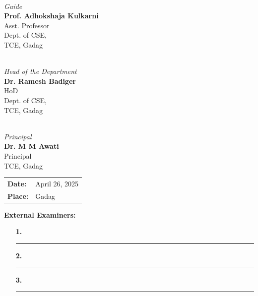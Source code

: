 \begin{minipage}[t]{0.3\textwidth}
    \centering
    \vspace{1.2cm}
    \hrulefill \\
    \emph{Guide}\\[0.15cm]
    \textbf{Prof. Adhokshaja Kulkarni}\\
    Asst. Professor\\
    Dept. of CSE,\\
    TCE, Gadag
\end{minipage}
\hfill
\begin{minipage}[t]{0.3\textwidth}
    \centering
    \vspace{1.2cm}
    \hrulefill \\
    \emph{Head of the Department}\\[0.15cm]
    \textbf{Dr. Ramesh Badiger}\\
    HoD\\
    Dept. of CSE,\\
    TCE, Gadag
\end{minipage}
\hfill
\begin{minipage}[t]{0.3\textwidth}
    \centering
    \vspace{1.2cm}
    \hrulefill \\
    \emph{Principal}\\[0.15cm]
    \textbf{Dr. M M Awati} \\
    Principal \\
    TCE, Gadag
\end{minipage}

\vspace{1cm}

\begin{minipage}[t]{0.45\textwidth}
    \vspace{0.4cm}
    \begin{tabular}{@{}ll}
        \textbf{Date:}  & April 26, 2025 \\
        \textbf{Place:} & Gadag
    \end{tabular}
\end{minipage}
\hfill
\begin{minipage}[t]{0.45\textwidth}
    \textbf{External Examiners:}
    \begin{itemize}
        \item[\textbf{1.}] \rule{5.5cm}{0.4pt}
        \item[\textbf{2.}] \rule{5.5cm}{0.4pt}
        \item[\textbf{3.}] \rule{5.5cm}{0.4pt}
    \end{itemize}
\end{minipage}